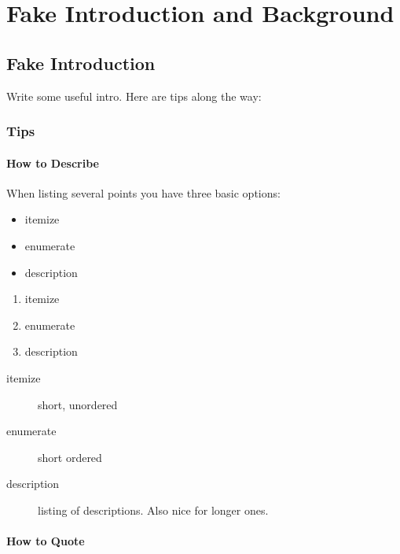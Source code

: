 \documentclass[11pt,
               a4paper,
               bibtotoc,
               idxtotoc,
               headsepline,
               footsepline,
               footexclude,
               BCOR12mm,
               DIV13,
               openany,   %
               ]
               {scrbook}
\begin{document}
\part{Fake Introduction and Background}
\chapter{Fake Introduction}
\label{sec:intro}       %
Write some useful intro. Here are tips along the way:

\section{Tips}
\subsection{How to Describe}
\setlength{\columnsep}{30 pt}
When listing several points you have three basic options:
\begin{multicols}{3}
    \begin{itemize}
        \item itemize
        \item enumerate
        \item description
    \end{itemize}

    \vfill\null
    \columnbreak

    \begin{enumerate}
        \item itemize
        \item enumerate
        \item description
    \end{enumerate}

    \vfill\null
    \columnbreak

    \begin{description}
        \item[itemize] short, unordered
        \item[enumerate] short ordered
        \item[description] listing of descriptions. Also nice for longer ones.
    \end{description}

\end{multicols}


\subsection{How to Quote}
\end{document}

